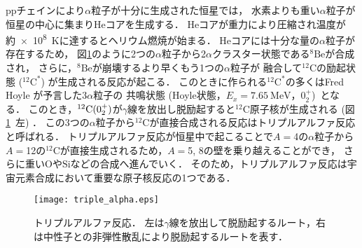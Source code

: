\documentclass[../master]{subfiles}
\begin{document}
ppチェインにより$\alpha$粒子が十分に生成された恒星では，
水素よりも重い$\alpha$粒子が恒星の中心に集まり$\mathrm{He}$コアを生成する．
$\mathrm{He}$コアが重力により圧縮され温度が約\SI{e8}{\kelvin}に達するとヘリウム燃焼が始まる．
$\mathrm{He}$コアには十分な量の$\alpha$粒子が存在するため，
図\ref{fig::triple_alpha}のように2つの$\alpha$粒子から2$\alpha$クラスター状態である${}^{8}\mathrm{Be}$が合成され，
さらに，${}^{8}\mathrm{Be}$が崩壊するより早くもう1つの$\alpha$粒子が
融合して${}^{12}\mathrm{C}$の励起状態 (${}^{12}\mathrm{C}^{*}$) が生成される反応が起こる．
このときに作られる${}^{12}\mathrm{C}^{*}$の多くはFred Hoyle が予言した$3\alpha$粒子の
共鳴状態 (Hoyle状態，$E_{x} = \SI{7.65}{\mega\electronvolt}$，$0_{2}^{+}$)~\cite{hoyle_state}となる．
このとき，${}^{12}{\rm C} (0_2^+)$が$\gamma$線を放出し脱励起すると${}^{12}\mathrm{C}$原子核が生成される
 (図\ref{fig::triple_alpha}~左) ．
この3つの$\alpha$粒子から${}^{12}\mathrm{C}$が直接合成される反応はトリプルアルファ反応と呼ばれる．
トリプルアルファ反応が恒星中で起こることで$A = $4の$\alpha$粒子から
$A = $12の${}^{12}\mathrm{C}$が直接生成されるため，$A = $5, 8の壁を乗り越えることができ，
さらに重い$\mathrm{O}$や$\mathrm{Si}$などの合成へ進んでいく．
そのため，トリプルアルファ反応は宇宙元素合成において重要な原子核反応の1つである．
\begin{figure}
  \centering
  \texttt{[image: triple\_alpha.eps]}
  \caption[トリプルアルファ反応．]{トリプルアルファ反応．
    左は$\gamma$線を放出して脱励起するルート，右は中性子との非弾性散乱により脱励起するルートを表す．}
  \label{fig::triple_alpha}
\end{figure}
\end{document}
